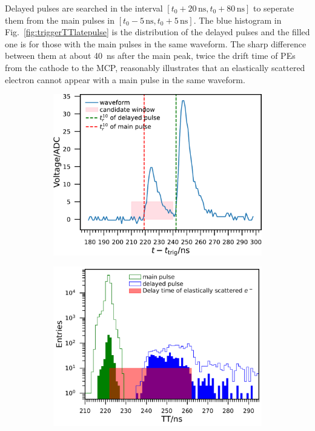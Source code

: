 Delayed pulses are searched in the interval $[t_0+20\,\mathrm{ns},t_0+80\,\mathrm{ns}]$ to seperate them from the main pulses in $[t_0-5\,\mathrm{ns},t_0+5\,\mathrm{ns}]$. The blue histogram in Fig.~\ref{fig:triggerTTlatepulse} is the distribution of the delayed pulses and the filled one is for those with the main pulses in the same waveform. The sharp difference between them at about \SI{40}{ns} after the main peak, twice the drift time of PEs from the cathode to the MCP, reasonably illustrates that an elastically scattered electron cannot appear with a main pulse in the same waveform.

\begin{figure}[!htbp]
    \centering
    \begin{subfigure}[t]{\SF\textwidth}
        \includegraphics[width=\textwidth]{figures/method/triggerDoublePulse.pdf}
        \caption{}%
        \label{fig:triggerTT2pulse}
    \end{subfigure}
    \begin{subfigure}[t]{\SF\textwidth}
        \includegraphics[width=\textwidth]{figures/method/triggerDelayedPulse.pdf}

\end{subfigure}
\end{figure}
